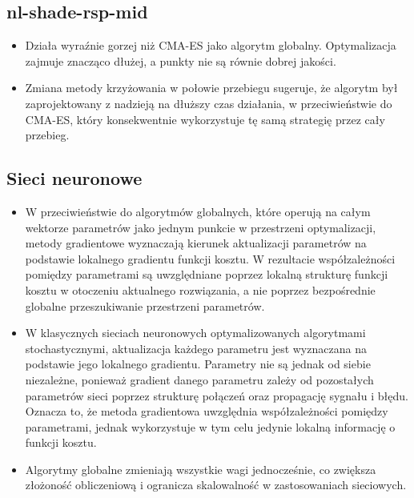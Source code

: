 \subsection*{nl-shade-rsp-mid}
\begin{itemize}
    \item Działa wyraźnie gorzej niż CMA-ES jako algorytm globalny. Optymalizacja zajmuje znacząco dłużej, a punkty nie są równie dobrej jakości.

    \item Zmiana metody krzyżowania w połowie przebiegu sugeruje, że algorytm był zaprojektowany z nadzieją na dłuższy czas działania, w przeciwieństwie do CMA-ES, który konsekwentnie wykorzystuje tę samą strategię przez cały przebieg.
\end{itemize}

\subsection*{Sieci neuronowe}
\begin{itemize}

    \item W przeciwieństwie do algorytmów globalnych, które operują na całym wektorze parametrów jako jednym punkcie w przestrzeni optymalizacji, metody gradientowe wyznaczają kierunek aktualizacji parametrów na podstawie lokalnego gradientu funkcji kosztu. W rezultacie współzależności pomiędzy parametrami są uwzględniane poprzez lokalną strukturę funkcji kosztu w otoczeniu aktualnego rozwiązania, a nie poprzez bezpośrednie globalne przeszukiwanie przestrzeni parametrów.

    \item W klasycznych sieciach neuronowych optymalizowanych algorytmami stochastycznymi, aktualizacja każdego parametru jest wyznaczana na podstawie jego lokalnego gradientu. Parametry nie są jednak od siebie niezależne, ponieważ gradient danego parametru zależy od pozostałych parametrów sieci poprzez strukturę połączeń oraz propagację sygnału i błędu. Oznacza to, że metoda gradientowa uwzględnia współzależności pomiędzy parametrami, jednak wykorzystuje w tym celu jedynie lokalną informację o funkcji kosztu.

    \item Algorytmy globalne zmieniają wszystkie wagi jednocześnie, co zwiększa złożoność obliczeniową i ogranicza skalowalność w zastosowaniach sieciowych.
\end{itemize}




